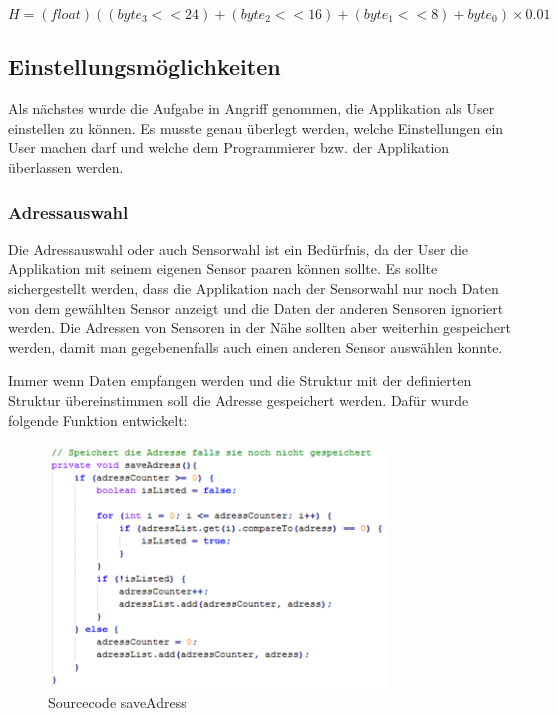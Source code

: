 \begin{equation}
	H = (float)((byte_3 << 24) + (byte_2 << 16) + (byte_1 << 8) + byte_0) \times 0.01
\end{equation}


\subsection{Einstellungsmöglichkeiten}

Als nächstes wurde die Aufgabe in Angriff genommen, die Applikation als User einstellen zu können. Es musste genau überlegt werden, welche Einstellungen ein User machen darf und welche dem Programmierer bzw. der Applikation überlassen werden.


\subsubsection{Adressauswahl}

Die Adressauswahl oder auch Sensorwahl ist ein Bedürfnis, da der User die Applikation mit seinem eigenen Sensor paaren können sollte. Es sollte sichergestellt werden, dass die Applikation nach der Sensorwahl nur noch Daten von dem gewählten Sensor anzeigt und die Daten der anderen Sensoren ignoriert werden. Die Adressen von Sensoren in der Nähe sollten aber weiterhin gespeichert werden, damit man gegebenenfalls auch einen anderen Sensor auswählen konnte.

Immer wenn Daten empfangen werden und die Struktur mit der definierten Struktur übereinstimmen soll die Adresse gespeichert werden. Dafür wurde folgende Funktion entwickelt:

\begin{figure}[ht]
    \includegraphics[width=0.8\textwidth]{3Vorgehen/imag/app_saveAdress.png}
    \caption{Sourcecode saveAdress}
	\label{app_saveAdress} 
\end{figure}

